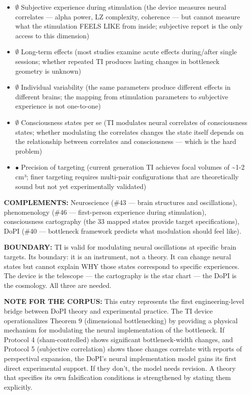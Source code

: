 \begin{itemize}[nosep,leftmargin=*]
  \item $\emptyset$ Subjective experience during stimulation (the device measures neural correlates — alpha power, LZ complexity, coherence — but cannot measure what the stimulation FEELS LIKE from inside; subjective report is the only access to this dimension)
  \item $\emptyset$ Long-term effects (most studies examine acute effects during/\allowbreak after single sessions; whether repeated TI produces lasting changes in bottleneck geometry is unknown)
  \item $\emptyset$ Individual variability (the same parameters produce different effects in different brains; the mapping from stimulation parameters to subjective experience is not one-to-one)
  \item $\emptyset$ Consciousness states per se (TI modulates neural correlates of consciousness states; whether modulating the correlates changes the state itself depends on the relationship between correlates and consciousness — which is the hard problem)
  \item $\bullet$ Precision of targeting (current generation TI achieves focal volumes of \textasciitilde{}1-2 cm³; finer targeting requires multi-pair configurations that are theoretically sound but not yet experimentally validated)
\end{itemize}


\textbf{COMPLEMENTS:} Neuroscience (\#43 — brain structures and oscillations), phenomenology (\#46 — first-person experience during stimulation), consciousness cartography (the 33 mapped states provide target specifications), DoPI (\#40 — bottleneck framework predicts what modulation should feel like).


\textbf{BOUNDARY:} TI is valid for modulating neural oscillations at specific brain targets. Its boundary: it is an instrument, not a theory. It can change neural states but cannot explain WHY those states correspond to specific experiences. The device is the telescope — the cartography is the star chart — the DoPI is the cosmology. All three are needed.


\textbf{NOTE FOR THE CORPUS:} This entry represents the first engineering-level bridge between DoPI theory and experimental practice. The TI device operationalizes Theorem 9 (dimensional bottlenecking) by providing a physical mechanism for modulating the neural implementation of the bottleneck. If Protocol 4 (sham-controlled) shows significant bottleneck-width changes, and Protocol 5 (subjective correlation) shows those changes correlate with reports of perspectival expansion, the DoPI's neural implementation model gains its first direct experimental support. If they don't, the model needs revision. A theory that specifies its own falsification conditions is strengthened by stating them explicitly.


